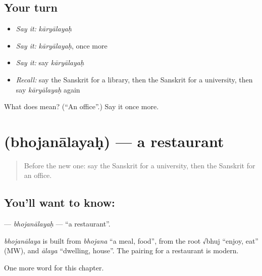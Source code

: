 \subsection*{Your turn}
\begin{itemize}
\raggedright
  \item \emph{Say it:} \emph{kāryālayaḥ}
  \item \emph{Say it:} \emph{kāryālayaḥ}, once more
  \item \emph{Say it:} say \emph{kāryālayaḥ}
  \item \emph{Recall:} say the Sanskrit for a library, then the Sanskrit for a university, then say \emph{kāryālayaḥ} again
\end{itemize}

\begin{tcolorbox}[breakable,colback=teal!4,colframe=teal!35!black,title={Before you move on}]
What does  mean? (\textquotedblleft{}An office\textquotedblright{}.) Say it once more.
\end{tcolorbox}
\section[\texorpdfstring{\sk{भोजनालयः} (bhojanālayaḥ)}{भोजनालयः (bhojanālayaḥ)}]{ (bhojanālayaḥ) — a restaurant}

\label{lesson:SA-C97-bhojanalayah}



\begin{quote}
Before the new one: say the Sanskrit for a university, then the Sanskrit for an office.
\end{quote}

\subsection*{You'll want to know: }
\textbf{} — \emph{bhojanālayaḥ} — \textquotedblleft{}a restaurant\textquotedblright{}.

\begin{cousinweb}
\emph{bhojanālaya} is built from \emph{bhojana} \textquotedblleft{}a meal, food\textquotedblright{}, from the root √bhuj \textquotedblleft{}enjoy, eat\textquotedblright{} (MW), and \emph{ālaya} \textquotedblleft{}dwelling, house\textquotedblright{}. The pairing for a restaurant is modern.
\end{cousinweb}

\begin{grammarlens}[title={What you've built}]
One more word for this chapter.
\end{grammarlens}

